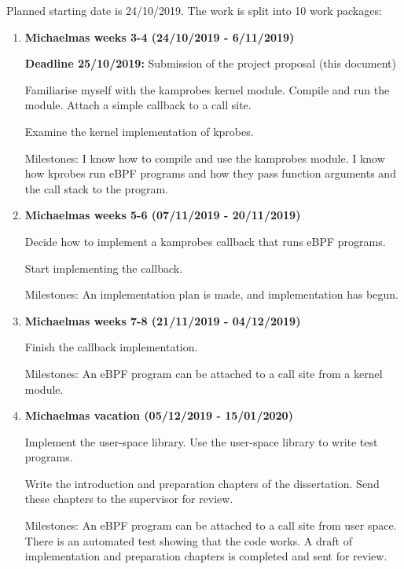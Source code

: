     Planned starting date is 24/10/2019. The work is split into 10 work packages:
    \begin{enumerate}

        \item {\bf Michaelmas weeks 3-4 (24/10/2019 - 6/11/2019)} 

            {\bf Deadline 25/10/2019:} Submission of the project proposal (this document) 

            Familiarise myself with the kamprobes kernel module. Compile and run the module.
            Attach a simple callback to a call site.

            Examine the kernel implementation of kprobes.

            Milestones: I know how to compile and use the kamprobes module.
            I know how kprobes run eBPF programs and how they pass function arguments and the call stack to the program.
        
        \item {\bf Michaelmas weeks 5-6 (07/11/2019 - 20/11/2019)} 

            Decide how to implement a kamprobes callback that runs eBPF programs.

            Start implementing the callback.

            Milestones: An implementation plan is made, and implementation has begun.

        \item {\bf Michaelmas weeks 7-8 (21/11/2019 - 04/12/2019)}

            Finish the callback implementation.

            Milestones: An eBPF program can be attached to a call site from a kernel module.

        \item {\bf Michaelmas vacation (05/12/2019 - 15/01/2020)}
        
            Implement the user-space library.
            Use the user-space library to write test programs.
            
            Write the introduction and preparation chapters of the dissertation.
            Send these chapters to the supervisor for review.

            Milestones: An eBPF program can be attached to a call site from user space.
            There is an automated test showing that the code works.
            A draft of implementation and preparation chapters is completed and sent for review.


\end{enumerate}
